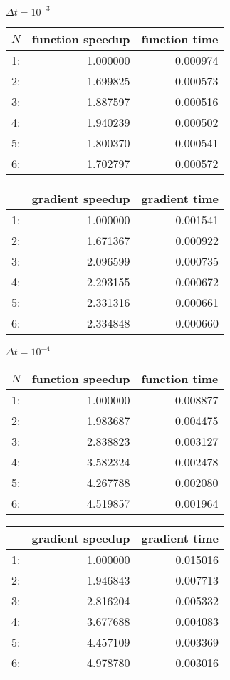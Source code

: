 \begin{center}
$\Delta t=10^{-3}$\\
\begin{tabular}{lrr}
\toprule
{}$N$ &  function speedup &     function time \\
\midrule
1:  &  1.000000 &  0.000974 \\
2: &  1.699825 &  0.000573 \\
3: &  1.887597 &  0.000516 \\
4: &  1.940239 &  0.000502 \\
5: &  1.800370 &  0.000541 \\
6: &  1.702797 &  0.000572 \\
\bottomrule
\end{tabular}
\begin{tabular}{lrr}
\toprule
{} &  gradient speedup &    gradient time \\
\midrule
1:  &  1.000000 &  0.001541 \\
2: &  1.671367 &  0.000922 \\
3: &  2.096599 &  0.000735 \\
4: &  2.293155 &  0.000672 \\
5: &  2.331316 &  0.000661 \\
6: &  2.334848 &  0.000660 \\
\bottomrule
\end{tabular}
\end{center}
\begin{center}
$\Delta t=10^{-4}$\\
\begin{tabular}{lrr}
\toprule
{} $N$&  function speedup &    function  time \\
\midrule
1:  &  1.000000 &  0.008877 \\
2: &  1.983687 &  0.004475 \\
3: &  2.838823 &  0.003127 \\
4: &  3.582324 &  0.002478 \\
5: &  4.267788 &  0.002080 \\
6: &  4.519857 &  0.001964 \\
\bottomrule
\end{tabular}
\begin{tabular}{lrr}
\toprule
{} &  gradient speedup &     gradient time \\
\midrule
1:  &  1.000000 &  0.015016 \\
2: &  1.946843 &  0.007713 \\
3: &  2.816204 &  0.005332 \\
4: &  3.677688 &  0.004083 \\
5: &  4.457109 &  0.003369 \\
6: &  4.978780 &  0.003016 \\
\bottomrule
\end{tabular}
\end{center}
